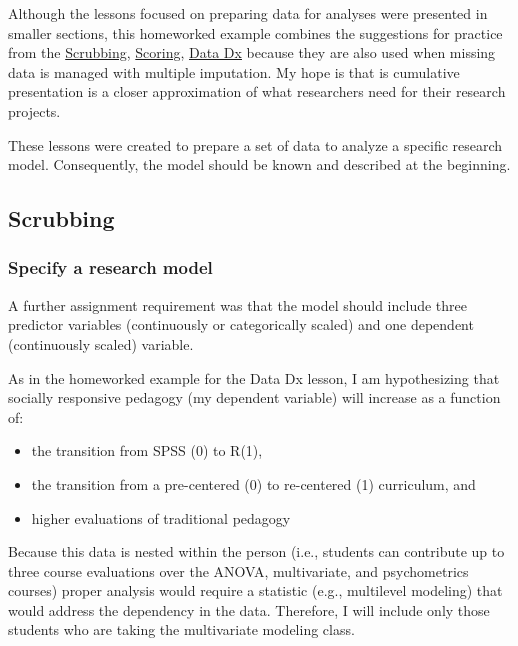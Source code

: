 \documentclass[
  11pt,
]{book}
\providecommand{\tightlist}{%
  \setlength{\itemsep}{0pt}\setlength{\parskip}{0pt}}
\begin{document}
Although the lessons focused on preparing data for analyses were presented in smaller sections, this homeworked example combines the suggestions for practice from the \protect\hyperlink{scrub}{Scrubbing}, \protect\hyperlink{scrub}{Scoring}, \protect\hyperlink{datadx}{Data Dx} because they are also used when missing data is managed with multiple imputation. My hope is that is cumulative presentation is a closer approximation of what researchers need for their research projects.

These lessons were created to prepare a set of data to analyze a specific research model. Consequently, the model should be known and described at the beginning.

\hypertarget{scrubbing-2}{%
\subsection{Scrubbing}\label{scrubbing-2}}

\hypertarget{specify-a-research-model-1}{%
\subsubsection*{Specify a research model}\label{specify-a-research-model-1}}


A further assignment requirement was that the model should include three predictor variables (continuously or categorically scaled) and one dependent (continuously scaled) variable.

As in the homeworked example for the Data Dx lesson, I am hypothesizing that socially responsive pedagogy (my dependent variable) will increase as a function of:

\begin{itemize}
\tightlist
\item
  the transition from SPSS (0) to R(1),
\item
  the transition from a pre-centered (0) to re-centered (1) curriculum, and
\item
  higher evaluations of traditional pedagogy
\end{itemize}

Because this data is nested within the person (i.e., students can contribute up to three course evaluations over the ANOVA, multivariate, and psychometrics courses) proper analysis would require a statistic (e.g., multilevel modeling) that would address the dependency in the data. Therefore, I will include only those students who are taking the multivariate modeling class.
\end{document}

